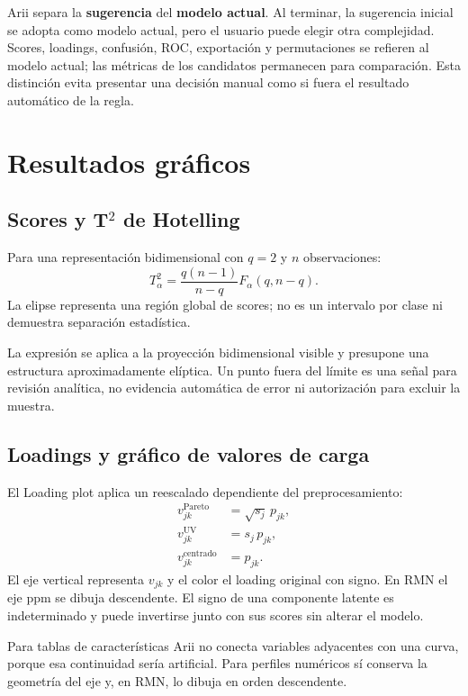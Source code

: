 \documentclass[11pt,a4paper,openany]{report}
\begin{document}
Arii separa la \textbf{sugerencia} del \textbf{modelo actual}. Al terminar, la sugerencia inicial se adopta como modelo actual, pero el usuario puede elegir otra complejidad. Scores, loadings, confusión, ROC, exportación y permutaciones se refieren al modelo actual; las métricas de los candidatos permanecen para comparación. Esta distinción evita presentar una decisión manual como si fuera el resultado automático de la regla.

\chapter{Resultados gráficos}
\section{Scores y T\texorpdfstring{$^2$}{2} de Hotelling}
Para una representación bidimensional con $q=2$ y $n$ observaciones:
\begin{equation}
  T^2_{\alpha}=\frac{q(n-1)}{n-q}F_{\alpha}(q,n-q).
\end{equation}
La elipse representa una región global de scores; no es un intervalo por clase ni demuestra separación estadística.

La expresión se aplica a la proyección bidimensional visible y presupone una estructura aproximadamente elíptica. Un punto fuera del límite es una señal para revisión analítica, no evidencia automática de error ni autorización para excluir la muestra.

\section{Loadings y gráfico de valores de carga}
El Loading plot aplica un reescalado dependiente del preprocesamiento:
\begin{align}
  v_{jk}^{\mathrm{Pareto}} &= \sqrt{s_j}\,p_{jk}, \\
  v_{jk}^{\mathrm{UV}} &= s_j\,p_{jk}, \\
  v_{jk}^{\mathrm{centrado}} &= p_{jk}.
\end{align}
El eje vertical representa $v_{jk}$ y el color el loading original con signo.
En RMN el eje ppm se dibuja descendente. El signo de una componente latente es indeterminado y puede invertirse junto con sus scores sin alterar el modelo.

Para tablas de características Arii no conecta variables adyacentes con una curva, porque esa continuidad sería artificial. Para perfiles numéricos sí conserva la geometría del eje y, en RMN, lo dibuja en orden descendente.
\end{document}
